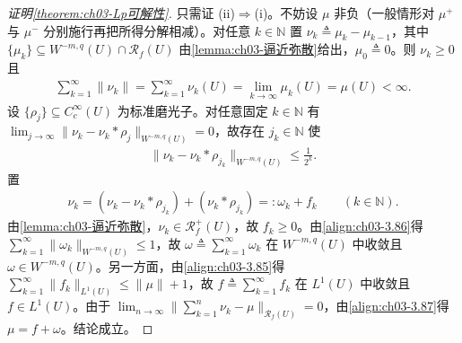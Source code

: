 \documentclass[../../main.tex]{subfiles}%
\begin{document}
\begin{proof}[证明\cref{theorem:ch03-Lp可解性}]
只需证 (ii)$\Rightarrow$(i)。不妨设 $\mu$ 非负（一般情形对 $\mu^+$ 与 $\mu^-$ 分别施行再把所得分解相减）。对任意 $k\in\mathbb{N}$ 置 $\nu_k\triangleq\mu_k-\mu_{k-1}$，其中 $\{\mu_k\}\subseteq W^{-m,q}(U)\cap\mathscr{R}_f(U)$ 由\cref{lemma:ch03-逼近弥散}给出，$\mu_0\triangleq0$。则 $\nu_k\geqslant0$ 且
\begin{align}
\sum_{k=1}^\infty\|\nu_k\|=\sum_{k=1}^\infty\nu_k(U)=\lim_{k\to\infty}\mu_k(U)=\mu(U)<\infty.\label{align:ch03-3.85}
\end{align}
设 $\{\rho_j\}\subseteq C^\infty_c(U)$ 为标准磨光子。对任意固定 $k\in\mathbb{N}$ 有 $\lim_{j\to\infty}\|\nu_k-\nu_k*\rho_j\|_{W^{-m,q}(U)}=0$，故存在 $j_k\in\mathbb{N}$ 使
\begin{align}
\|\nu_k-\nu_k*\rho_{j_k}\|_{W^{-m,q}(U)}\leqslant\frac1{2^k}.\label{align:ch03-3.86}
\end{align}
置
\begin{align}
\nu_k=(\nu_k-\nu_k*\rho_{j_k})+(\nu_k*\rho_{j_k})=:\omega_k+f_k\qquad(k\in\mathbb{N}).\label{align:ch03-3.87}
\end{align}
由\cref{lemma:ch03-逼近弥散}，$\nu_k\in\mathscr{R}^+_f(U)$，故 $f_k\geqslant0$。由\eqref{align:ch03-3.86}得 $\sum_{k=1}^\infty\|\omega_k\|_{W^{-m,q}(U)}\leqslant1$，故 $\omega\triangleq\sum_{k=1}^\infty\omega_k$ 在 $W^{-m,q}(U)$ 中收敛且 $\omega\in W^{-m,q}(U)$。另一方面，由\eqref{align:ch03-3.85}得 $\sum_{k=1}^\infty\|f_k\|_{L^1(U)}\leqslant\|\mu\|+1$，故 $f\triangleq\sum_{k=1}^\infty f_k$ 在 $L^1(U)$ 中收敛且 $f\in L^1(U)$。由于 $\lim_{n\to\infty}\|\sum_{k=1}^n\nu_k-\mu\|_{\mathscr{R}_f(U)}=0$，由\eqref{align:ch03-3.87}得 $\mu=f+\omega$。结论成立。
\end{proof}
\end{document}
